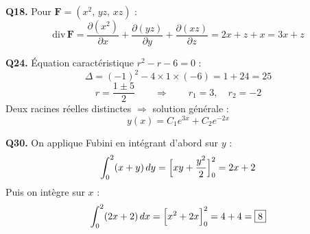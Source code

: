 \documentclass[11pt,a4paper]{article}
\begin{document}
\smallskip
\noindent\textbf{Q18.} Pour $\mathbf{F}=(x^2,\,yz,\,xz)$ :
$$\text{div}\,\mathbf{F} = \frac{\partial(x^2)}{\partial x} + \frac{\partial(yz)}{\partial y} + \frac{\partial(xz)}{\partial z} = 2x + z + x = \boxed{3x + z}$$

\smallskip
\noindent\textbf{Q24.} Équation caractéristique $r^2 - r - 6 = 0$ :
$$\Delta = (-1)^2 - 4\times 1 \times(-6) = 1 + 24 = 25$$
$$r = \frac{1\pm 5}{2} \qquad \Rightarrow \qquad r_1 = 3, \quad r_2 = -2$$
Deux racines réelles distinctes $\Rightarrow$ solution générale :
$$\boxed{y(x) = C_1 e^{3x} + C_2 e^{-2x}}$$

\smallskip
\noindent\textbf{Q30.} On applique Fubini en intégrant d'abord sur $y$ :
$$\int_0^2(x+y)\,dy = \Bigl[xy+\frac{y^2}{2}\Bigr]_0^2 = 2x + 2$$
Puis on intègre sur $x$ :
$$\int_0^2(2x+2)\,dx = \Bigl[x^2+2x\Bigr]_0^2 = 4 + 4 = \boxed{8}$$
\end{document}
